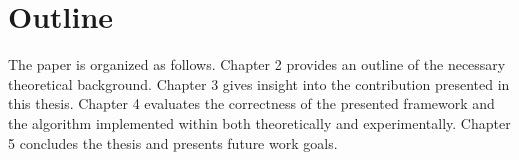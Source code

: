 \section{Outline}

The paper is organized as follows. Chapter 2 provides an outline of the necessary theoretical background. Chapter 3 gives insight into the contribution presented in this thesis. Chapter 4 evaluates the correctness of the presented framework and the algorithm implemented within both theoretically and experimentally. Chapter 5 concludes the thesis and presents future work goals.
